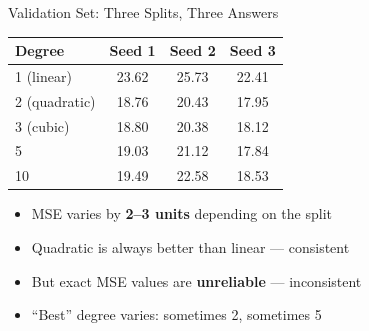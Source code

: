 \documentclass[aspectratio=169, 11pt]{beamer}
\begin{document}
\begin{frame}{Validation Set: Three Splits, Three Answers}

\begin{center}
\begin{tabular}{lccc}
\toprule
Degree & Seed 1 & Seed 2 & Seed 3 \\
\midrule
1 (linear) & 23.62 & 25.73 & 22.41 \\
2 (quadratic) & 18.76 & 20.43 & 17.95 \\
3 (cubic) & 18.80 & 20.38 & 18.12 \\
5 & 19.03 & 21.12 & 17.84 \\
10 & 19.49 & 22.58 & 18.53 \\
\bottomrule
\end{tabular}
\end{center}

\vspace{0.5em}
\begin{itemize}
  \item MSE varies by \textbf{2--3 units} depending on the split
  \item Quadratic is always better than linear --- \textcolor{softgreen}{consistent}
  \item But exact MSE values are \textbf{unreliable} --- \textcolor{softred}{inconsistent}
  \item ``Best'' degree varies: sometimes 2, sometimes 5
\end{itemize}

\centering
\vspace{0.3em}
\end{frame}
\end{document}
